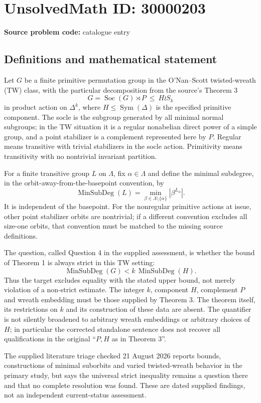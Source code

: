 \documentclass[11pt]{article}
\begin{document}
\section*{UnsolvedMath ID: 30000203}
\textbf{Source problem code:} catalogue entry
\subsection{Definitions and mathematical statement}
Let $G$ be a finite primitive permutation group in the O'Nan--Scott twisted-wreath (TW) class, with the particular decomposition from the source's Theorem 3
\[
 G=\operatorname{Soc}(G)\rtimes P\ \leq\ H\wr S_k
\]
in product action on $\Delta^k$, where $H\leq\operatorname{Sym}(\Delta)$ is the specified primitive component. The socle is the subgroup generated by all minimal normal subgroups; in the TW situation it is a regular nonabelian direct power of a simple group, and a point stabilizer is a complement represented here by $P$. Regular means transitive with trivial stabilizers in the socle action. Primitivity means transitivity with no nontrivial invariant partition.

For a finite transitive group $L$ on $\Lambda$, fix $\alpha\in\Lambda$ and define the minimal subdegree, in the orbit-away-from-the-basepoint convention, by
\[
 \operatorname{MinSubDeg}(L)=
 \min_{\beta\in\Lambda\setminus\{\alpha\}}|\beta^{L_\alpha}|.
\]
It is independent of the basepoint. For the nonregular primitive actions at issue, other point stabilizer orbits are nontrivial; if a different convention excludes all size-one orbits, that convention must be matched to the missing source definitions.

The question, called Question 4 in the supplied assessment, is whether the bound of Theorem 1 is always strict in this TW setting:
\[
 \operatorname{MinSubDeg}(G)
       < k\,\operatorname{MinSubDeg}(H).
\]
Thus the target excludes equality with the stated upper bound, not merely violation of a non-strict estimate. The integer $k$, component $H$, complement $P$ and wreath embedding must be those supplied by Theorem 3. The theorem itself, its restrictions on $k$ and its construction of these data are absent. The quantifier is not silently broadened to arbitrary wreath embeddings or arbitrary choices of $H$; in particular the corrected standalone sentence does not recover all qualifications in the original ``$P,H$ as in Theorem 3''.

The supplied literature triage checked 21 August 2026 reports bounds, constructions of minimal suborbits and varied twisted-wreath behavior in the primary study, but says the universal strict inequality remains a question there and that no complete resolution was found. These are dated supplied findings, not an independent current-status assessment.
\end{document}
